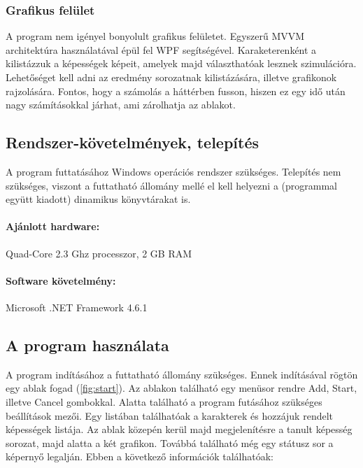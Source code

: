 \documentclass[12pt]{article}
\begin{document}
\subsubsection{Grafikus felület}

A program nem igényel bonyolult grafikus felületet. Egyszerű MVVM architektúra használatával épül fel WPF segítségével. 
Karaketerenként a kilistázzuk a képességek képeit, amelyek majd választhatóak lesznek szimulációra. Lehetőséget kell adni az eredmény sorozatnak kilistázására, illetve grafikonok rajzolására.
Fontos, hogy a számolás a háttérben fusson, hiszen ez egy idő után nagy számításokkal járhat, ami zárolhatja az ablakot.

\subsection{Rendszer-követelmények, telepítés}

A program futtatásához Windows operációs rendszer szükséges. Telepítés nem szükséges, viszont a futtatható állomány mellé el kell helyezni a (programmal együtt kiadott) dinamikus könyvtárakat is.

\paragraph{Ajánlott hardware:} 

Quad-Core 2.3 Ghz processzor, 2 GB RAM

\paragraph{Software követelmény:} 

Microsoft .NET Framework 4.6.1

\pagebreak

\subsection{A program használata}

A program indításához a futtatható állomány szükséges. Ennek indításával rögtön egy ablak fogad (\ref{fig:start}). Az ablakon található egy menüsor rendre Add, Start, illetve Cancel gombokkal. Alatta található a program futásához szükséges beállítások mezői. Egy listában találhatóak a karakterek és hozzájuk rendelt képességek listája. Az ablak közepén kerül majd megjelenítésre a tanult képesség sorozat, majd alatta a két grafikon. Továbbá található még egy státusz sor a képernyő legalján. Ebben a következő információk találhatóak: 
\end{document}
